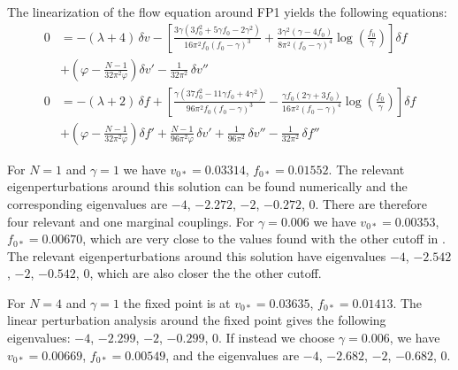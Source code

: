 \documentclass[11pt]{book} %
\begin{document}
The linearization of the flow equation around FP1 yields the following
equations:
\begin{align}
  0 &= - (\lambda+4) \, \delta v
       - \left[\frac{3\gamma\left(3f_0^2+5\gamma f_0-2\gamma^2\right)}
                    {16\pi^2f_0(f_0-\gamma)^3}
       + \frac{3 \gamma ^2 (\gamma -4f_0)}{8\pi^2(f_0-\gamma)^4}\log\left(\frac{f_0}{\gamma}\right)\right]\delta\! f  \nonumber \\
    &  + \left(\varphi-\frac{N-1}{32\pi^2\varphi}\right)\delta v'
       - \frac{1}{32\pi^2} \, \delta v'' \\
  0 &= - (\lambda +2) \, \delta\! f
       + \left[ \frac{\gamma\left(37 f_0^2-11\gamma f_0+4\gamma^2\right)}
                    {96\pi^2 f_0(f_0-\gamma)^3}
       - \frac{\gamma f_0(2\gamma+3f_0)}{16\pi^2(f_0-\gamma)^4} \log\left(\frac{f_0}{\gamma }\right) \right] \delta\! f  \nonumber \\
    &  + \left(\varphi-\frac{N-1}{32\pi^2\varphi}\right)\delta\! f'
       + \frac{N-1}{96\pi^2\varphi} \, \delta v'
       + \frac{1}{96\pi^2} \, \delta v''
       - \frac{1}{32\pi^2} \, \delta\! f''
\end{align}

For $N=1$ and $\gamma=1$ we have $v_{0*}=0.03314$, $f_{0*}=0.01552$.
The relevant eigenperturbations around this solution
can be found numerically and the corresponding eigenvalues are
$-4$, $-2.272$, $-2$, $-0.272$, $0$.
There are therefore four relevant and one marginal couplings.
For $\gamma=0.006$ we have $v_{0*}=0.00353$, $f_{0*}=0.00670$,
which are very close to the values found with the other cutoff in \cite{Percacci:2015wwa}.
The relevant eigenperturbations around this solution
have eigenvalues $-4$, $-2.542$, $-2$, $-0.542$, $0$,
which are also closer the the other cutoff.

For $N=4$ and $\gamma=1$ the fixed point is at $v_{0*}=0.03635$, $f_{0*}=0.01413$.
The linear perturbation analysis around the fixed point gives the following eigenvalues: $-4$, $-2.299$, $-2$, $-0.299$, $0$.
If instead we choose $\gamma=0.006$, we have $v_{0*}=0.00669$, $f_{0*}=0.00549$,
and the eigenvalues are $-4$, $-2.682$, $-2$, $-0.682$, $0$.
\end{document}
